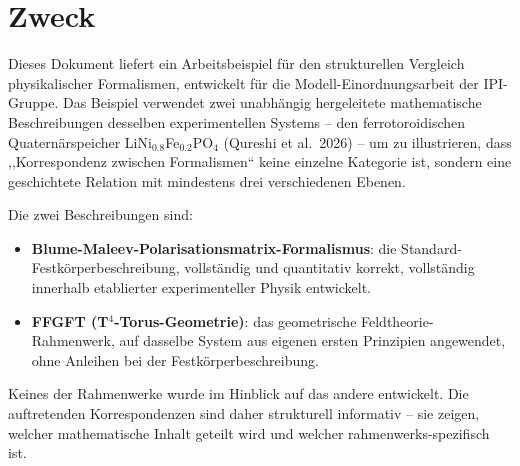 %
%

\section*{Zweck}

Dieses Dokument liefert ein Arbeitsbeispiel für den strukturellen Vergleich
physikalischer Formalismen, entwickelt für die Modell-Einordnungsarbeit der
IPI-Gruppe. Das Beispiel verwendet zwei unabhängig hergeleitete mathematische
Beschreibungen desselben experimentellen Systems -- den ferrotoroidischen
Quaternärspeicher LiNi$_{0.8}$Fe$_{0.2}$PO$_4$ (Qureshi et al.\ 2026) --
um zu illustrieren, dass ,,Korrespondenz zwischen Formalismen`` keine einzelne
Kategorie ist, sondern eine geschichtete Relation mit mindestens drei
verschiedenen Ebenen.

Die zwei Beschreibungen sind:
\begin{itemize}
  \item \textbf{Blume-Maleev-Polarisationsmatrix-Formalismus}: die Standard-
        Festkörperbeschreibung, vollständig und quantitativ korrekt, vollständig
        innerhalb etablierter experimenteller Physik entwickelt.
  \item \textbf{FFGFT (T$^4$-Torus-Geometrie)}: das geometrische Feldtheorie-
        Rahmenwerk, auf dasselbe System aus eigenen ersten Prinzipien angewendet,
        ohne Anleihen bei der Festkörperbeschreibung.
\end{itemize}

\noindent Keines der Rahmenwerke wurde im Hinblick auf das andere entwickelt.
Die auftretenden Korrespondenzen sind daher strukturell informativ -- sie
zeigen, welcher mathematische Inhalt geteilt wird und welcher
rahmenwerks-spezifisch ist.

